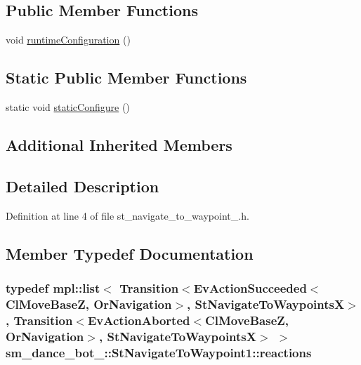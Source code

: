\subsection*{Public Member Functions}
\begin{DoxyCompactItemize}
\item 
void \hyperlink{structsm__dance__bot__3_1_1StNavigateToWaypoint1_add47ae3906464ce88ea494d555b8be17}{runtime\+Configuration} ()
\end{DoxyCompactItemize}
\subsection*{Static Public Member Functions}
\begin{DoxyCompactItemize}
\item 
static void \hyperlink{structsm__dance__bot__3_1_1StNavigateToWaypoint1_aacdce3db32451c1fa7816693d819e8a9}{static\+Configure} ()
\end{DoxyCompactItemize}
\subsection*{Additional Inherited Members}


\subsection{Detailed Description}


Definition at line 4 of file st\+\_\+navigate\+\_\+to\+\_\+waypoint\+\_.\+h.



\subsection{Member Typedef Documentation}
\subsubsection[{\texorpdfstring{reactions}{reactions}}]{\setlength{\rightskip}{0pt plus 5cm}typedef mpl\+::list$<$ Transition$<$Ev\+Action\+Succeeded$<${\bf Cl\+Move\+BaseZ}, {\bf Or\+Navigation}$>$, {\bf St\+Navigate\+To\+WaypointsX}$>$, Transition$<$Ev\+Action\+Aborted$<${\bf Cl\+Move\+BaseZ}, {\bf Or\+Navigation}$>$, {\bf St\+Navigate\+To\+WaypointsX}$>$ $>$ {\bf sm\+\_\+dance\+\_\+bot\+\_\+::\+St\+Navigate\+To\+Waypoint1\+::reactions}}\hypertarget{structsm__dance__bot__3_1_1StNavigateToWaypoint1_a8baf82b2287fdb1d80b8de5e5502c2a5}{}\label{structsm__dance__bot__3_1_1StNavigateToWaypoint1_a8baf82b2287fdb1d80b8de5e5502c2a5}


